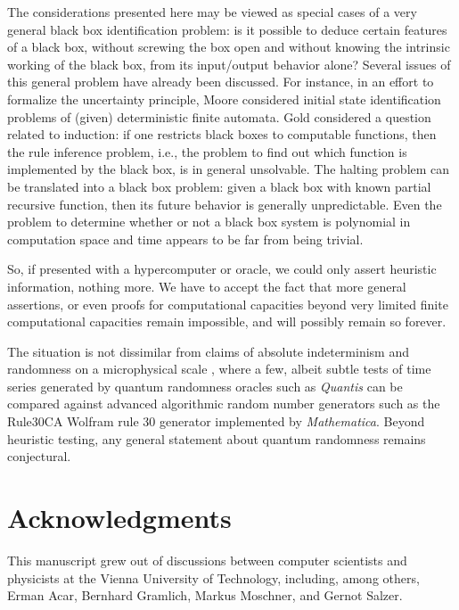 \documentclass[12pt]{article}
\begin{document}
The considerations presented here may be viewed as special cases of a very general black box identification problem:
is it possible to deduce certain features of a black box, without screwing the box open and without knowing the intrinsic
working of the black box, from its input/output behavior alone?
Several issues of this general problem have already been discussed.
For instance, in an effort to formalize the uncertainty principle,
Moore \cite{e-f-moore} considered initial state identification problems of (given) deterministic finite automata.
Gold  \cite{go-67,blum75blum,angluin:83,ad-91,li:92} considered a question related to induction:
if one restricts black boxes to computable functions, then the rule inference problem,
i.e., the problem to find out which function
is implemented by the black box, is in general unsolvable.
The halting problem \cite{turing-36,rogers1,odi:89}
can be translated into a black box problem: given a black box
with known partial recursive  function,
then its future behavior is generally unpredictable.
Even the problem to determine whether or not a black box system is polynomial in computation space and
time appears to be far from being trivial.

So, if presented with a hypercomputer or oracle, we could only assert heuristic information, nothing more.
We have to accept the fact that more general assertions, or even proofs for computational capacities
beyond very limited finite computational capacities remain impossible, and will possibly remain so forever.

The situation is not dissimilar from claims of absolute indeterminism and randomness on a microphysical scale
\cite{svozil-qct}, where a few, albeit subtle tests of time series \cite{calude-dinneen05} generated by
quantum randomness oracles such as {\it Quantis}\textsuperscript{\texttrademark}  \cite{Quantis} can be compared against
advanced algorithmic random number generators
such as the  Rule30CA Wolfram rule 30 generator  implemented by {\it Mathematica}\textsuperscript{\textregistered}.
Beyond heuristic testing, any general statement about quantum randomness remains conjectural.



\section{Acknowledgments}
This manuscript grew out of discussions between computer scientists and physicists at the Vienna University of Technology,
including, among others, Erman Acar, Bernhard Gramlich, Markus Moschner, and Gernot Salzer.
\end{document}
